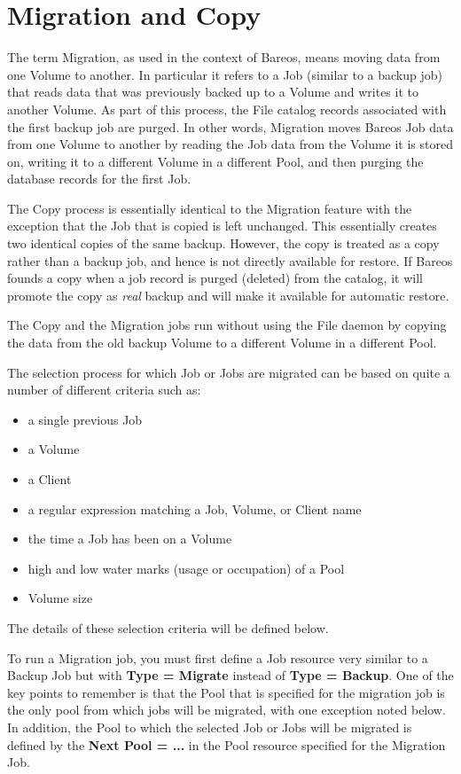 
\chapter{Migration and Copy}
\label{MigrationChapter}

The term Migration, as used in the context of Bareos, means moving data from
one Volume to another.  In particular it refers to a Job (similar to a backup
job) that reads data that was previously backed up to a Volume and writes
it to another Volume.  As part of this process, the File catalog records
associated with the first backup job are purged.  In other words, Migration
moves Bareos Job data from one Volume to another by reading the Job data
from the Volume it is stored on, writing it to a different Volume in a
different Pool, and then purging the database records for the first Job.

The Copy process is essentially identical to the Migration feature with the
exception that the Job that is copied is left unchanged.  This essentially
creates two identical copies of the same backup. However, the copy is treated
as a copy rather than a backup job, and hence is not directly available for
restore. If Bareos founds a copy when a job record is purged (deleted) from the
catalog, it will promote the copy as \textsl{real} backup and will make it
available for automatic restore.

The Copy and the Migration jobs run without using the File daemon by copying
the data from the old backup Volume to a different Volume in a different Pool.

The selection process for which Job or Jobs are migrated
can be based on quite a number of different criteria such as:
\begin{itemize}
\item a single previous Job
\item a Volume
\item a Client
\item a regular expression matching a Job, Volume, or Client name
\item the time a Job has been on a Volume
\item high and low water marks (usage or occupation) of a Pool
\item Volume size
\end{itemize}

The details of these selection criteria will be defined below.

To run a Migration job, you must first define a Job resource very similar
to a Backup Job but with {\bf Type = Migrate} instead of {\bf Type =
Backup}.  One of the key points to remember is that the Pool that is
specified for the migration job is the only pool from which jobs will
be migrated, with one exception noted below. In addition, the Pool to
which the selected Job or Jobs will be migrated is defined by the {\bf
Next Pool = ...} in the Pool resource specified for the Migration Job.

